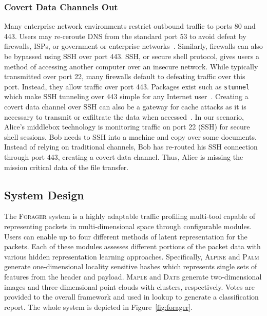 \subsubsection{Covert Data Channels Out}
Many enterprise network environments restrict outbound traffic to ports 80 and 443. Users may re-reroute DNS from the standard port 53 to avoid defeat by firewalls, ISPs, or government or enterprise networks~\cite{shane-review-dns-over-http-04}. Similarly, firewalls can also be bypassed using SSH over port 443. SSH, or secure shell protocol, gives users a method of accessing another computer over an insecure network. While typically transmitted over port 22, many firewalls default to defeating traffic over this port. Instead, they allow traffic over port 443. Packages exist such as \texttt{stunnel} which make SSH tunneling over 443 simple for any Internet user~\cite{wong2001stunnel}. Creating a covert data channel over SSH can also be a gateway for cache attacks as it is necessary to transmit or exfiltrate the data when accessed~\cite{Maurice2017HelloFT}. In our scenario, Alice's middlebox technology is monitoring traffic on port 22 (SSH) for secure shell sessions. Bob needs to SSH into a machine and copy over some documents. Instead of relying on traditional channels, Bob has re-routed his SSH connection through port 443, creating a covert data channel. Thus, Alice is missing the mission critical data of the file transfer.

\subsection{System Design}

The \textsc{Forager} system is a highly adaptable traffic profiling multi-tool capable of representing packets in multi-dimensional space through configurable modules. Users can enable up to four different methods of latent representation for the packets. Each of these modules assesses different portions of the packet data with various hidden representation learning approaches. Specifically, \textsc{Alpine} and \textsc{Palm}~\cite{kapoor2022deep} generate one-dimensional locality sensitive hashes which represents single sets of features from the header and payload. \textsc{Maple} and \textsc{Date} generate two-dimensional images and three-dimensional point clouds with clusters, respectively. Votes are provided to the overall framework and used in lookup to generate a classification report. The whole system is depicted in Figure~\ref{fig:forager}.

